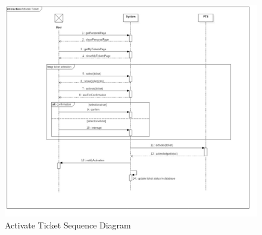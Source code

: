 \documentclass{article}
\begin{document}
\begin{figure}[H]
\includegraphics[width=\linewidth]{Activate_Ticket.jpg}
\caption{Activate Ticket Sequence Diagram}
\label{fig:SQ6}
\end{figure}
\end{document}

